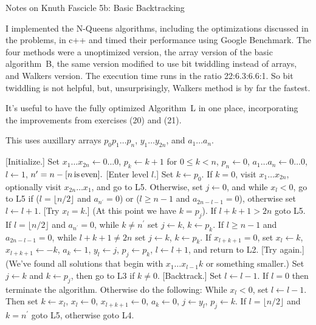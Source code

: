 \def\newstep#1{\smallskip \noindent {\bf #1}}
\def\newprob#1{\vskip 0.12in \noindent {\bf #1}}

\topglue 0.5in
\centerline{Notes on Knuth Fascicle 5b: Basic Backtracking}
\vskip 0.3in


I implemented the N-Queens algorithms, including the optimizations
discussed in the problems, in c++ and timed their performance using
Google Benchmark.  The four methods were a  unoptimized
version, the array version of the basic algorithm~B, the
same version modified to use bit twiddling instead of arrays,
and Walkers version.  The execution time runs in the ratio
22:6.3:6.6:1.  So bit twiddling is not helpful, but, unsurprisingly,
Walkers method is by far the fastest.

\vskip 0.1in

It's useful to have the fully optimized Algorithm~L in one place, incorporating
the improvements from exercises (20) and (21).

\noindent This uses auxillary arrays $p_0 p_1 \ldots p_n$, $y_1 \ldots y_{2n}$, and
$a_1 \ldots a_n$.

 [Initialize.] Set $x_1 \ldots x_{2 n} \leftarrow 0 \ldots 0$,
$p_k \leftarrow k + 1$ for $0 \leq k < n$, $p_n \leftarrow 0$, 
$a_{1} \ldots a_{n} \leftarrow 0 \ldots 0$, $l \leftarrow 1$,
$n^{\prime} = n - [n \rm{\, is\, even}].$
\vskip 0.05in
 [Enter level $l$.] Set $k \gets p_0$.  If $k = 0$, visit
$x_1 \ldots x_{2n}$, optionally visit $x_{2n} \ldots x_1$, and 
go to L5.  Otherwise, set $j \leftarrow 0$, and
while $x_l < 0$, go to L5 if ($l = \lfloor n / 2 \rfloor$ and $a_{n^{\prime}} = 0$) 
or ($l \ge n - 1$ and $a_{2n - l - 1} = 0$), otherwise
set $l \leftarrow l + 1$.
\vskip 0.05in
 [Try $x_l = k$.] (At this point we have $k = p_j$).  If $l + k + 1 > 2n$
goto L5.  If $l = \lfloor n / 2 \rfloor$ and $a_{n^{\prime}} = 0$, while $k \ne n^{\prime}$
set $j \leftarrow k$, $k \leftarrow p_k$.  If $l \ge n - 1$ and $a_{2n - l - 1} = 0$, 
while $l + k + 1 \ne 2 n $ set $j \leftarrow k$, $k \leftarrow p_k$.  If $x_{l + k + 1} = 0$, 
set $x_l \leftarrow k$, $x_{l + k + 1} \leftarrow -k$,
$a_k \leftarrow 1$, $y_l \leftarrow j$, $p_j \leftarrow p_k$, $l \leftarrow l + 1$, and return to L2.
\vskip 0.05in
 [Try again.] (We've found all solutions that begin with $x_1 \ldots x_{l-1} k$
or something smaller.) Set $j \leftarrow k$ and $k \leftarrow p_j$, then go to L3 if $k \ne 0$.
\vskip 0.05in
 [Backtrack.] Set $l \leftarrow l - 1$.   If $l = 0$ then terminate the algorithm.
Otherwise do the following: While $x_l < 0$, set $l \leftarrow l - 1$.  Then set 
$k \leftarrow x_l$, $x_l \leftarrow 0$, $x_{l + k + 1} \leftarrow 0$, $a_k \leftarrow 0$, 
$j \leftarrow y_l$, $p_j \leftarrow k$.  If $l = \lfloor n / 2 \rfloor$ and $k = n^{\prime}$
goto L5, otherwise goto L4.

\bye